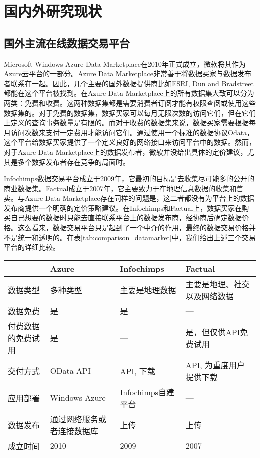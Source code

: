 \chapter{国内外研究现状}

\section{国外主流在线数据交易平台}

Microsoft Windows Azure Data Marketplace\cite{MicrosoftAzure}在2010年正式成立，微软将其作为Azure云平台的一部分。Azure Data Marketplace非常善于将数据买家与数据发布者联系在一起。因此，几个主要的国外数据提供商比如ESRI, Dun and Bradstreet 都能在这个平台被找到。在Azure Data Marketplace上的所有数据集大致可以分为两类：免费和收费。这两种数据集都是需要消费者订阅才能有权限查阅或使用这些数据集的。对于免费的数据集，数据买家可以每月无限次数的访问它们，但在它们上定义的查询事务数量是有限的。而对于收费的数据集来说，数据买家需要根据每月访问次数来支付一定费用才能访问它们。通过使用一个标准的数据协议Odata，这个平台给数据买家提供了一个定义良好的网络接口来访问平台中的数据。然而，对于Azure Data Marketplace上的数据发布者，微软并没给出具体的定价建议，尤其是多个数据发布者存在竞争的局面时。

Infochimps\cite{infochimps}数据交易平台成立于2009年，它最初的目标是去收集尽可能多的公开的商业数据集。Factual\cite{factual}成立于2007年，它主要致力于在地理信息数据的收集和售卖。与Azure Data Marketplace存在同样的问题是，这二者都没有为平台上的数据发布商提供一个明确的定价策略建议。在Infochimps和Factual上，数据买家在购买自己想要的数据时只能去直接联系平台上的数据发布商，经协商后确定数据价格。这么看来，数据交易平台只是起到了一个中介的作用，最终的数据交易价格并不是统一和透明的。在表\ref{tab:comparison_datamarket}中，我们给出上述三个交易平台的详细比较。

\begin{table}[h]
\centering
{}
 \begin{tabular}{|p{2.5cm}|p{2.5cm}|p{2.5cm}|p{2.5cm}|}
        \hline
               & Azure~\cite{MicrosoftAzure} & Infochimps~\cite{infochimps} & Factual~\cite{factual} \\
        \hline
        \hline
          数据类型  & 多种类型 & 主要是地理数据 & 主要是地理、社交以及网络数据 \\
        \hline
          数据免费  & 是 & 是 & ---\\
        \hline
          付费数据的免费试用  & 是 & --- & 是，但仅供API免费试用 \\
        \hline
          交付方式  & OData API & API, 下载 & API, 为重度用户提供下载\\
        \hline
          应用部署  & Windows Azure & Infochimps自建平台 & --- \\
        \hline
          数据发布  & 通过网络服务或者连接数据库 & 上传 & 上传 \\
        \hline
        成立时间  & 2010 & 2009 & 2007 \\
        \hline
 \end{tabular}
\end{table}

